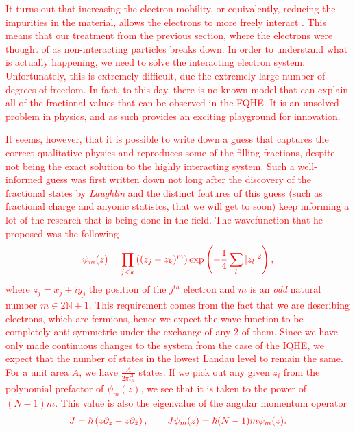  \textcolor{red}{It turns out that increasing the electron mobility, or equivalently, reducing the impurities in the material, allows the electrons to more freely interact \cite{PhysRevB.37.8476}. This means that our treatment from the previous section, where the electrons were thought of as non-interacting particles breaks down. In order to understand what is actually happening, we need to solve the interacting electron system. Unfortunately, this is extremely difficult, due the extremely large number of degrees of freedom. In fact, to this day, there is no known model that can explain all of the fractional values that can be observed in the FQHE. It is an unsolved problem in physics, and as such provides an exciting playground for innovation.}
 
 \textcolor{red}{It seems, however, that it is possible to write down a guess that captures the correct qualitative physics and reproduces some of the filling fractions, despite not being the exact solution to the highly interacting system. Such a well-informed guess was first written down not long after the discovery of the fractional states by \textit{Laughlin} \cite{Laughlin:1983fy} and the distinct features of this guess (such as fractional charge and anyonic statistcs, that we will get to soon) keep informing a lot of the research that is being done in the field. The wavefunction that he proposed was the following }
\begin{align}
    \textcolor{red}{\psi_m(z)= \prod_{j<k} \left((z_j -z_k)^m \right) \exp\left(- \frac{1}{4}\sum\limits_{l}|z_l|^2\right),}
\end{align}
 \textcolor{red}{where $z_j= x_j+iy_j$ the position of the $j^{th}$ electron and $m$ is an \textit{odd} natural number $m \in 2\mathbb{N}+1$. This requirement comes from the fact that we are describing electrons, which are fermions, hence we expect the wave function to be completely anti-symmetric under the exchange of any 2 of them. Since we have only made continuous changes to the system from the case of the IQHE, we expect that the number of states in the lowest Landau level to remain the same. For a unit area $A$, we have $\frac{A}{2\pi l_B^2}$ states. If we pick out any given $z_i$ from the polynomial prefactor of $\psi_m(z)$, we see that it is taken to the power of $(N-1)m$. This value is also the eigenvalue of the angular momentum operator}
\begin{align}
    \textcolor{red}{J = \hbar \left(z \partial_z -\bar{z} \partial_{\bar{z}}\right), \qquad J\psi_m(z) = \hbar (N-1)m \psi_m(z).}
\end{align}
